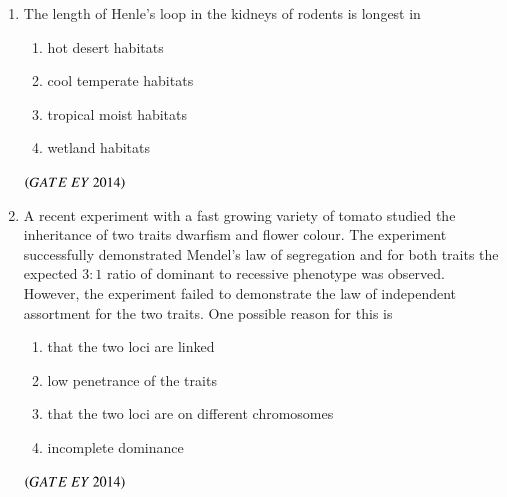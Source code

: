 \documentclass[journal]{IEEEtran}
\numberwithin{equation}{enumi}
\numberwithin{figure}{enumi}
\begin{document}
\begin{enumerate}
    \item The length of Henle's loop in the kidneys of rodents is longest in
    \begin{multicols}{2}
    \begin{enumerate}
        \item hot desert habitats
        \item cool temperate habitats
        \item tropical moist habitats
        \item wetland habitats
    \end{enumerate}
    \end{multicols}
    \hfill{$\brak{ GATE\ EY\ 2014}$}
    \bigskip
    
    \item A recent experiment with a fast growing variety of tomato studied the inheritance of two traits dwarfism and flower colour. The experiment successfully demonstrated Mendel's law of segregation and for both traits the expected $3:1$ ratio of dominant to recessive phenotype was observed. However, the experiment failed to demonstrate the law of independent assortment for the two traits. One possible reason for this is
    \begin{multicols}{2}
    \begin{enumerate}
        \item that the two loci are linked
        \item low penetrance of the traits
        \item that the two loci are on different chromosomes
        \item incomplete dominance
    \end{enumerate}
    \end{multicols}
    \hfill{$\brak{ GATE\ EY\ 2014}$}
    \bigskip


\end{enumerate}
\end{document}
